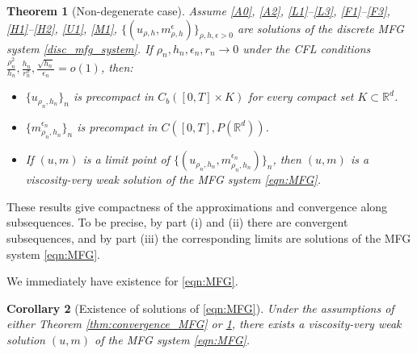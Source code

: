 \documentclass[a4paper,  twoside, 10pt, leqno]{amsart}
\newcommand{\rd}{\mathbb{R}^d}
\newtheorem{thm}{Theorem}[section]
\newtheorem{corollary}[thm]{Corollary}
\theoremstyle{remark}
\theoremstyle{definition}
\begin{document}
\begin{thm}[Non-degenerate case]\label{thm:convergence_MFG-nondeg}
Assume \ref{A0}, \ref{A2}, \ref{L1}--\ref{L3}, \ref{F1}--\ref{F3}, \ref{H1}--\ref{H2}, \ref{U1}, \ref{M1}, $\{(u_{\rho,h}, m^{\epsilon}_{\rho,h})\}_{\rho,h,\epsilon>0}$ are  solutions of the discrete MFG system
\eqref{disc_mfg_system}. If $\rho_n,h_n,\epsilon_n,r_n\to 0$ under the CFL conditions $\frac{\rho_n^2}{h_n},\frac{h_n}{r_n^{\sigma}},\frac{\sqrt{h_n}}{\epsilon_n}=o(1)$, then:
\begin{itemize}
\item[(i)] $\{u_{\rho_n,h_n}\}_n$  is precompact in  $C_b([0,T]\times K)$ for every compact set $K \subset \rd$. 
\item[(ii)] $\{m^{\epsilon_n}_{\rho_n,h_n}\}_n$ is precompact in $C([0,T],P(\rd))$.  
\item[(iii)] If $(u,m)$ is a limit point of $\{(u_{\rho_n,h_n}, m^{\epsilon_n}_{\rho_n,h_n})\}_n$, then $(u,m)$ is a viscosity-very weak solution of the MFG system \eqref{eqn:MFG}.
\end{itemize}
\end{thm}


 These results give compactness of the approximations and convergence along subsequences. To be precise, by part (i) and (ii) there are convergent subsequences, and by part (iii) the corresponding limits are solutions of the MFG system \eqref{eqn:MFG}. 

We immediately have existence for \eqref{eqn:MFG}. 
\begin{corollary}[Existence of solutions of \eqref{eqn:MFG}] \label{corollary:mfg_ex}
Under the assumptions of either Theorem \ref{thm:convergence_MFG} or \ref{thm:convergence_MFG-nondeg}, there exists a viscosity-very weak solution $(u,m)$ of the MFG system \eqref{eqn:MFG}.   
\end{corollary} 
\end{document}
